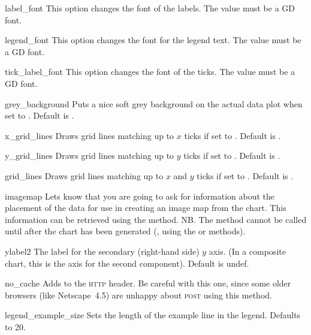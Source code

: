 \begin{AttrDecl}{label\_font}
This option changes the font of the labels. The value must be a GD font.
\end{AttrDecl}

\begin{AttrDecl}{legend\_font}
This option changes the font for the legend text. The value must be a
GD font.
\end{AttrDecl}

\begin{AttrDecl}{tick\_label\_font}
This option changes the font of the ticks. The value must be a GD font.
\end{AttrDecl}

\begin{AttrDecl}{grey\_background}
Puts a nice soft grey background on the actual data plot when set to
. Default is .
\end{AttrDecl}

\begin{AttrDecl}{x\_grid\_lines}
Draws grid lines matching up to $x$ ticks if set to .
Default is .
\end{AttrDecl}

\begin{AttrDecl}{y\_grid\_lines}
Draws grid lines matching up to $y$ ticks if set to .
Default is .
\end{AttrDecl}

\begin{AttrDecl}{grid\_lines}
Draws grid lines matching up to $x$ and $y$ ticks if set to
. Default is .
\end{AttrDecl}

\begin{AttrDecl}{imagemap}
Lets \chart know that you are going to ask for information about the
placement of the data for use in creating an image map from the chart.
This information can be retrieved using the
\mbox{}
method. NB. The  method cannot be called
until after the chart has been generated (\eg, using the 
or  methods).
\end{AttrDecl}

\begin{AttrDecl}{ylabel2}
The label for the secondary (right-hand side) $y$ axis. (In a composite
chart, this is the axis for the second component). Default is undef.
\end{AttrDecl}

\begin{AttrDecl}{no\_cache}
Adds  to the \textsc{http} header.
Be careful with this one, since some older browsers (like Netscape~4.5)
are unhappy about \textsc{post} using this method.
\end{AttrDecl}

\begin{AttrDecl}{legend\_example\_size}
Sets the length of the example line in the legend. Defaults to 20.
\end{AttrDecl}

